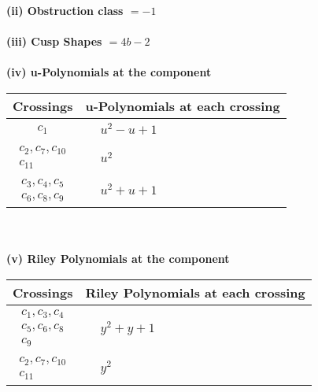 \documentclass[1p]{elsarticle_modified}
\theoremstyle{definition}
\begin{document}
\flushleft \textbf{(ii) Obstruction class $= -1$}\\~\\
\flushleft \textbf{(iii) Cusp Shapes $= 4 b-2$}\\~\\
\newpage\renewcommand{\arraystretch}{1}
\flushleft \textbf{(iv) u-Polynomials at the component}\newline \\
\begin{tabular}{m{50pt}|m{274pt}}
Crossings & \hspace{64pt}u-Polynomials at each crossing \\
\hline $$\begin{aligned}c_{1}\end{aligned}$$&$\begin{aligned}
&u^2- u+1
\end{aligned}$\\
\hline $$\begin{aligned}c_{2},c_{7},c_{10}\\c_{11}\end{aligned}$$&$\begin{aligned}
&u^2
\end{aligned}$\\
\hline $$\begin{aligned}c_{3},c_{4},c_{5}\\c_{6},c_{8},c_{9}\end{aligned}$$&$\begin{aligned}
&u^2+u+1
\end{aligned}$\\
\hline
\end{tabular}\\~\\
\newpage\renewcommand{\arraystretch}{1}
\flushleft \textbf{(v) Riley Polynomials at the component}\newline \\
\begin{tabular}{m{50pt}|m{274pt}}
Crossings & \hspace{64pt}Riley Polynomials at each crossing \\
\hline $$\begin{aligned}c_{1},c_{3},c_{4}\\c_{5},c_{6},c_{8}\\c_{9}\end{aligned}$$&$\begin{aligned}
&y^2+y+1
\end{aligned}$\\
\hline $$\begin{aligned}c_{2},c_{7},c_{10}\\c_{11}\end{aligned}$$&$\begin{aligned}
&y^2
\end{aligned}$\\
\hline
\end{tabular}\\~\\
\end{document}
